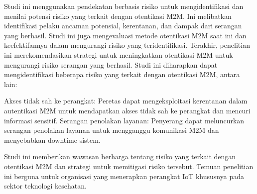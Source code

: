 Studi ini menggunakan pendekatan berbasis risiko untuk mengidentifikasi dan menilai potensi risiko yang terkait dengan otentikasi M2M. Ini melibatkan identifikasi pelaku ancaman potensial, kerentanan, dan dampak dari serangan yang berhasil. Studi ini juga mengevaluasi metode otentikasi M2M saat ini dan keefektifannya dalam mengurangi risiko yang teridentifikasi. Terakhir, penelitian ini merekomendasikan strategi untuk meningkatkan otentikasi M2M untuk mengurangi risiko serangan yang berhasil. Studi ini diharapkan dapat mengidentifikasi beberapa risiko yang terkait dengan otentikasi M2M, antara lain:

Akses tidak sah ke perangkat: Peretas dapat mengeksploitasi kerentanan dalam autentikasi M2M untuk mendapatkan akses tidak sah ke perangkat dan mencuri informasi sensitif.
Serangan penolakan layanan: Penyerang dapat meluncurkan serangan penolakan layanan untuk mengganggu komunikasi M2M dan menyebabkan downtime sistem.

Studi ini memberikan wawasan berharga tentang risiko yang terkait dengan otentikasi M2M dan strategi untuk memitigasi risiko tersebut. Temuan penelitian ini berguna untuk organisasi yang menerapkan perangkat IoT khususnya pada sektor teknologi kesehatan.